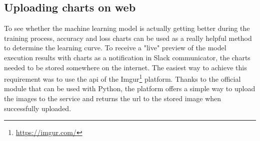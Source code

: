 \subsection{Uploading charts on web}\label{subsec:charts-web-uploading}
To see whether the machine learning model is actually getting better during the training process, accuracy and loss charts can be used as a really helpful method to determine the learning curve.
To receive a "live" preview of the model execution results with charts as a notification in Slack communicator, the charts needed to be stored somewhere on the internet.
The easiest way to achieve this requirement was to use the \gls{api} of the Imgur\footnote{\url{https://imgur.com/}} platform.
Thanks to the official module that can be used with Python, the platform offers a simple way to upload the images to the service and returns the \gls{url} to the stored image when successfully uploaded.
